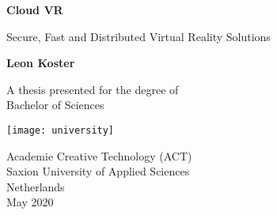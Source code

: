 \begin{titlepage}
   \begin{center}
       \vspace*{1cm}

       \textbf{Cloud VR}

       \vspace{0.5cm}
        Secure, Fast and Distributed Virtual Reality Solutions
            
       \vspace{1.5cm}

       \textbf{Leon Koster}

       \vfill
            
       A thesis presented for the degree of\\
       Bachelor of Sciences
            
       \vspace{0.8cm}
     
      \texttt{[image: university]}
            
       Academie Creative Technology (ACT)\\
       Saxion University of Applied Sciences\\
       Netherlands\\
       May 2020
            
   \end{center}
\end{titlepage}